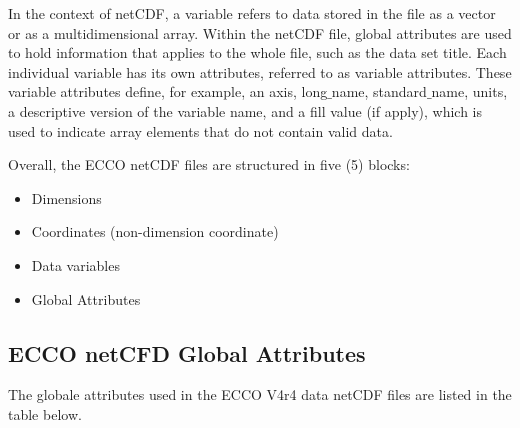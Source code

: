 In the context of netCDF, a variable refers to data stored in the file as a vector or as a
multidimensional array. Within the netCDF file, global attributes are used to hold information that applies to the whole file, such
as the data set title. Each individual variable has its own attributes, referred to as variable attributes. These variable attributes define, for example, an axis, long$\_$name, standard$\_$name, units, a descriptive version of the variable name, and a fill value (if apply), which is used to indicate array elements that do not
contain valid data.

\par \vspace{0.1in} Overall, the ECCO netCDF  files are structured in five (5) blocks: 
\begin{itemize}
    \item Dimensions
    \item Coordinates (non-dimension coordinate)
    \item Data variables
    \item Global Attributes
\end{itemize}

\subsection{ECCO netCFD Global Attributes}
\par The globale attributes used in the ECCO V4r4 data netCDF files are listed in the table below.




 




